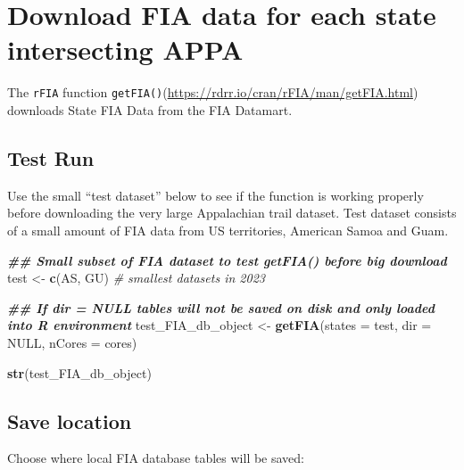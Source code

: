 \documentclass[
]{book}
\newenvironment{Shaded}{\begin{snugshade}}{\end{snugshade}}
\newcommand{\AttributeTok}[1]{\textcolor[rgb]{0.13,0.29,0.53}{#1}}
\newcommand{\CommentTok}[1]{\textcolor[rgb]{0.56,0.35,0.01}{\textit{#1}}}
\newcommand{\ConstantTok}[1]{\textcolor[rgb]{0.56,0.35,0.01}{#1}}
\newcommand{\DocumentationTok}[1]{\textcolor[rgb]{0.56,0.35,0.01}{\textbf{\textit{#1}}}}
\newcommand{\FunctionTok}[1]{\textcolor[rgb]{0.13,0.29,0.53}{\textbf{#1}}}
\newcommand{\NormalTok}[1]{#1}
\newcommand{\OtherTok}[1]{\textcolor[rgb]{0.56,0.35,0.01}{#1}}
\newcommand{\StringTok}[1]{\textcolor[rgb]{0.31,0.60,0.02}{#1}}
\begin{document}
\hypertarget{download-fia-data-for-each-state-intersecting-appa}{%
\section{Download FIA data for each state intersecting APPA}\label{download-fia-data-for-each-state-intersecting-appa}}

The \texttt{rFIA} function \texttt{getFIA()}(\url{https://rdrr.io/cran/rFIA/man/getFIA.html}) downloads State FIA Data from the FIA Datamart.

\hypertarget{test-run}{%
\subsection{Test Run}\label{test-run}}

Use the small ``test dataset'' below to see if the function is working properly before downloading the very large Appalachian trail dataset. Test dataset consists of a small amount of FIA data from US territories, American Samoa and Guam.

\begin{Shaded}
\begin{Highlighting}[]
\DocumentationTok{\#\# Small subset of FIA dataset to test \textquotesingle{}getFIA()\textquotesingle{} before big download}
\NormalTok{test }\OtherTok{\textless{}{-}} \FunctionTok{c}\NormalTok{(}\StringTok{\textquotesingle{}AS\textquotesingle{}}\NormalTok{, }\StringTok{\textquotesingle{}GU\textquotesingle{}}\NormalTok{) }\CommentTok{\# smallest datasets in 2023}

\DocumentationTok{\#\# If dir = NULL tables will not be saved on disk and only loaded into R environment}
\NormalTok{test\_FIA\_db\_object }\OtherTok{\textless{}{-}} \FunctionTok{getFIA}\NormalTok{(}\AttributeTok{states =}\NormalTok{ test, }\AttributeTok{dir =} \ConstantTok{NULL}\NormalTok{, }\AttributeTok{nCores =}\NormalTok{ cores) }

\FunctionTok{str}\NormalTok{(test\_FIA\_db\_object)}
\end{Highlighting}
\end{Shaded}

\hypertarget{save-location}{%
\subsection{Save location}\label{save-location}}

Choose where local FIA database tables will be saved:
\end{document}
